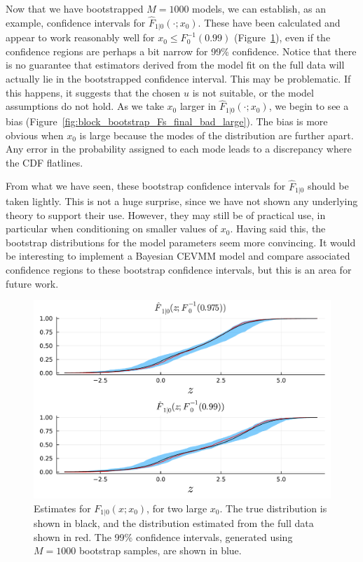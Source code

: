 \documentclass[11pt,twoside,openany]{book}
\numberwithin{Theorem}{chapter}
\numberwithin{Definition}{chapter}
\numberwithin{Lemma}{chapter}
\numberwithin{Algorithm}{chapter}
\numberwithin{equation}{chapter}
\begin{document}
\FloatBarrier
Now that we have bootstrapped $M=1000$ models, we
can establish, as an example,
confidence intervals for $\hat F_{1|0}(\cdot;x_0)$. These have been calculated
and appear to work reasonably well for $x_0\leq F_0^{-1}(0.99)$
(Figure~\ref{fig:block_bootstrap_Fs_final}), even if
the confidence regions are perhaps a bit narrow for 99\% confidence.
Notice that there is no guarantee that estimators derived from the model fit on the full data will actually lie
in the bootstrapped confidence interval. This may be problematic. If this happens,
it suggests that the chosen $u$ is not suitable, or the model assumptions do not hold.
As we take $x_0$ larger in $\hat F_{1|0}(\cdot;x_0)$, we begin to
see a bias (Figure~\ref{fig:block_bootstrap_Fs_final_bad_large}).
The bias is more obvious when $x_0$ is large because the modes of the
distribution are further apart. Any error in the probability
assigned to each mode leads to a discrepancy where the CDF flatlines.

From what we have seen, these bootstrap confidence intervals for $\hat F_{1|0}$
should be taken lightly. This is not a huge surprise, since we have not shown
any underlying theory to support their use. However, they may still be of
practical use, in particular when conditioning on smaller values of $x_0$.
Having said this, the bootstrap distributions for the model parameters seem
more convincing. It would be interesting to implement a Bayesian CEVMM model
and compare associated confidence regions to these bootstrap confidence intervals,
but this is an area for future work.

\begin{figure}[htp]
  \centering
  \includegraphics[scale=0.75]{../ht-em/figures/block_bootstrap_Fs_final2.pdf}
  \caption{Estimates for $F_{1|0}(x;x_0)$, for two large $x_0$.
    The true distribution is shown in black, and the distribution estimated from the full data shown in red.
    The 99\% confidence intervals, generated using $M=1000$ bootstrap samples, are shown in blue.}
    \label{fig:block_bootstrap_Fs_final}
\end{figure}
\end{document}
